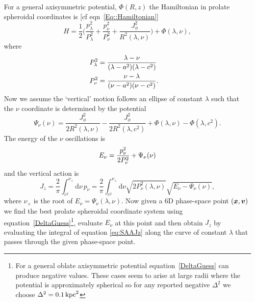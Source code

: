 \documentclass[useAMS,usenatbib,fleqn,a4paper]{mn2e}
\def\kpc{\,{\rm kpc}}
\def\half{{\textstyle{\frac12}}}
\newcommand{\bs}[1]{\bmath{#1}}
\begin{document}
For a general axisymmetric potential, $\Phi(R,z)$ the Hamiltonian in prolate
spheroidal coordinates is [cf eqn~\ref{Eq::Hamiltonian}]
\begin{equation}
H = \half\Big(\frac{p_\lambda^2}{P_\lambda^2}+\frac{p_\nu^2}{P_\nu^2}
+\frac{J_\phi^2}{R^2(\lambda,\nu)}\Big)+\Phi(\lambda,\nu),
\end{equation}
where
\begin{equation}
\begin{split}
P_\lambda^2 &=\frac{\lambda-\nu}{(\lambda-a^2)(\lambda-c^2)}\cr
P_\nu^2 &=\frac{\nu-\lambda}{(\nu-a^2)(\nu-c^2)}.
\end{split}
\end{equation}
Now we assume the `vertical' motion follows an ellipse of constant
$\lambda$ such that the $\nu$ coordinate is determined by the
potential
\begin{equation}
\Psi_\nu(\nu) = \frac{J_\phi^2}{2R^2(\lambda,\nu)}
-\frac{J_\phi^2}{2R^2(\lambda,c^2)}+\Phi(\lambda,\nu)-\Phi(\lambda,c^2).
\end{equation}
The energy of the $\nu$ oscillations is
\begin{equation}
E_\nu = {p_\nu^2\over2P_\nu^2} + \Psi_\nu(\nu)
\end{equation}
and the vertical action is
\begin{equation}\label{eq:SAAJz}
J_z = \frac{2}{\pi}\int_{c^2}^{\nu_+}\mathrm{d}\nu\,p_\nu 
= \frac{2}{\pi}\int_{c^2}^{\nu_+}\mathrm{d}\nu\sqrt{2P_\nu^2(\lambda,\nu)}\sqrt{E_\nu-\Psi_\nu(\nu)},
\end{equation}
where $\nu_+$ is the root of $E_\nu=\Psi_\nu(\lambda,\nu)$.  Now given a 6D
phase-space point $(\bs{x},\bs{v})$ we  find the best prolate spheroidal
coordinate system using equation~\eqref{DeltaGuess}\footnote{For a general
oblate axisymmetric potential equation~\eqref{DeltaGuess} can produce
negative values. These cases seem to arise at large radii where the potential
is approximately spherical so for any reported negative $\Delta^2$ we choose
$\Delta^2 = 0.1\kpc^2$}, evaluate $E_\nu$ at this point and then obtain $J_z$
by evaluating the integral of equation \eqref{eq:SAAJz} along the curve of constant
$\lambda$ that passes through the given phase-space point.
\end{document}
